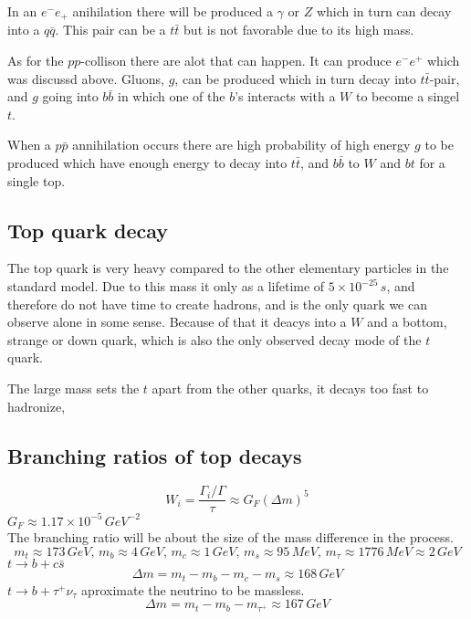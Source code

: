 	In an $e^-e_+$ anihilation there will be produced a $\gamma$ or $Z$
	which in turn can decay into a $q\bar{q}$. This pair can be a $t\bar{t}$ but is
	not favorable due to its high mass.

	As for the $pp$-collison there are alot that can happen. It can produce $e^-e^+$ which was 
	discussd above. Gluons, $g$, can be produced which in turn decay into $t\bar{t}$-pair,
	and $g$ going into $b\bar{b}$ in which one of the $b$'s interacts with a $W$ to become
	a singel $t$.

	When a $p\bar{p}$ annihilation occurs there are high probability of high energy $g$ to
	be produced which have enough energy to decay into $t\bar{t}$, and $b\bar{b}$ to $W$ and $bt$
	for a single top.

  \subsection{Top quark decay}

    The top quark is very heavy compared to the other elementary particles in the standard model.
    Due to this mass it only as a lifetime of $5\times 10^{-25}\,s$, and therefore do not have time
    to create hadrons, and is the only quark we can observe alone in some sense. 
    Because of that it deacys into a $W$ and a bottom, strange or down quark, which is also the only 
    observed decay mode of the $t$ quark.

    The large mass sets the $t$ apart from the other quarks, it decays too fast to hadronize, 


  \subsection{Branching ratios of top decays}
    \[ W_i = \frac{\Gamma_i/\Gamma}{\tau} \approx G_F (\Delta m)^5\]
    $G_F \approx 1.17 \times 10^{-5}\,GeV^{-2}$\\
    The branching ratio will be about the size of the mass difference in the process.
    \[m_t \approx 173\,GeV,\,m_b \approx 4\,GeV,\, m_c \approx 1\,GeV,\, m_s \approx %
      95\,MeV,\, m_{\tau} \approx 1776\,MeV \approx 2\,GeV\]
    $t\rightarrow b+c\bar{s}$
    \[ \Delta m = m_t - m_b - m_c - m_s  \approx  168\,GeV\]
    $t\rightarrow b + \tau^+\nu_{\tau}$ aproximate the neutrino to be massless.
    \[ \Delta m = m_t - m_b - m_{\tau^+}  \approx  167\,GeV\]
    
